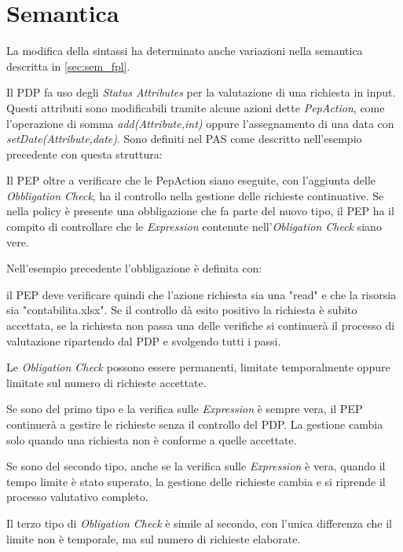 \section{Semantica}
\label{sub:Semantica_Ext}
La modifica della sintassi ha determinato anche variazioni nella semantica descritta in \ref{sec:sem_fpl}.\par
Il \ac{PDP} fa uso degli \emph{Status Attributes} per la valutazione di una richiesta in input.
Questi attributi sono modificabili tramite alcune azioni dette \emph{PepAction}, come l'operazione di somma \emph{add(Attribute,int)}
oppure l'assegnamento di una data con \emph{setDate(Attribute,date)}.
Sono definiti nel \ac{PAS} come descritto nell'esempio precedente con questa struttura:

\par Il \ac{PEP} oltre a verificare che le PepAction siano eseguite, con l'aggiunta delle \emph{Obbligation Check}, ha il
controllo nella gestione delle richieste continuative. Se nella policy è presente una obbligazione che fa parte del nuovo tipo,
il \ac{PEP} ha il compito di controllare che le \emph{Expression} contenute nell'\emph{Obligation Check} siano vere.\par
Nell'esempio precedente l'obbligazione è definita con:

il \ac{PEP} deve verificare quindi che l'azione richiesta sia una "read" e che la risorsia sia "contabilita.xlsx".
Se il controllo dà esito positivo la richiesta è subito accettata, se la richiesta non passa una delle verifiche si continuerà
il processo di valutazione ripartendo dal \ac{PDP} e svolgendo tutti i passi.\par
Le \emph{Obligation Check} possono essere permanenti, limitate temporalmente oppure limitate sul numero di richieste
accettate.\par
\begin{description}[labelindent=5pt,style=multiline,leftmargin=3.5cm]
  \item[Permanenti]Se sono del primo tipo e la verifica sulle \emph{Expression} è sempre vera, il \ac{PEP} continuerà a gestire le
  richieste senza il controllo del \ac{PDP}. La gestione cambia solo quando una richiesta non è conforme a quelle accettate.\par
  \item[Scadenza sul tempo]Se sono del secondo tipo, anche se la verifica sulle \emph{Expression} è vera, quando il tempo limite è stato superato,
  la gestione delle richieste cambia e si riprende il processo valutativo completo.
  \item[Scadenza sul numero di richieste]Il terzo tipo di \emph{Obligation Check} è simile al secondo, con l'unica differenza che il limite non è temporale,
  ma sul numero di richieste elaborate.
\end{description}

